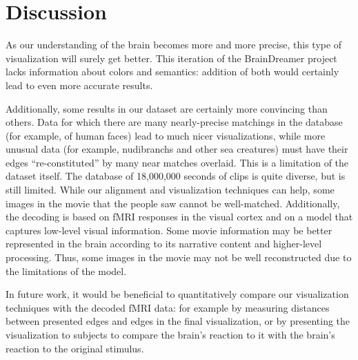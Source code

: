 
\section{Discussion}

As our understanding of the brain becomes more and more precise, this type of visualization will surely get better.  This iteration of the BrainDreamer project lacks information about colors and semantics: addition of both would certainly lead to even more accurate results.

Additionally, some results in our dataset are certainly more convincing than others.  Data for which there are many nearly-precise matchings in the database (for example, of human faces) lead to much nicer visualizations, while more unusual data (for example, nudibranchs and other sea creatures) must have their edges ``re-constituted'' by many near matches overlaid.  This is a limitation of the dataset itself. The database of 18,000,000 seconds of clips is quite diverse, but is still limited. While our alignment and visualization techniques can help, some images in the movie that the people saw cannot be well-matched. Additionally, the decoding is based on fMRI responses in the visual cortex and on a model that captures low-level visual information. Some movie information may be better represented in the brain according to its narrative content and higher-level processing. Thus, some images in the movie may not be well reconstructed due to the limitations of the model.

In future work, it would be beneficial to quantitatively compare our visualization techniques with the decoded fMRI data: for example by measuring distances between presented edges and edges in the final visualization, or by presenting the visualization to subjects to compare the brain's reaction to it with the brain's reaction to the original stimulus.